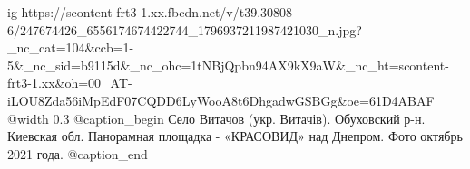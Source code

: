  
 
 
 
 

\ifcmt
  ig https://scontent-frt3-1.xx.fbcdn.net/v/t39.30808-6/247674426_6556174674422744_1796937211987421030_n.jpg?_nc_cat=104&ccb=1-5&_nc_sid=b9115d&_nc_ohc=1tNBjQpbn94AX9kX9aW&_nc_ht=scontent-frt3-1.xx&oh=00_AT-iLOU8Zda56iMpEdF07CQDD6LyWooA8t6DhgadwGSBGg&oe=61D4ABAF
  @width 0.3
	@caption_begin
	  Село Витачов (укр. Витачів). Обуховский р-н. Киевская обл. 
		Панорамная площадка - «КРАСОВИД» над Днепром. Фото октябрь 2021 года.
	@caption_end
\fi

